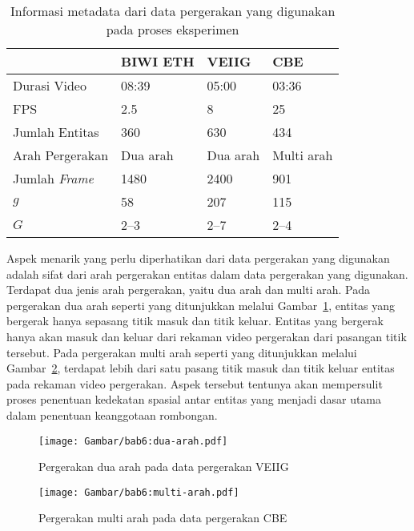 \begin{table}[h]
    \centering
    \caption[Metadata sumber data pergerakan]{Informasi metadata dari data pergerakan yang digunakan pada proses eksperimen}
    \begin{tabular}{p{3cm} p{2.5cm} p{2.5cm} p{3cm}}
        \hline
        & \textbf{BIWI ETH} & \textbf{VEIIG} & \textbf{CBE} \\
        \hline
        Durasi Video & 08:39 & 05:00 & 03:36 \\
        FPS & 2.5 & 8 & 25 \\
        Jumlah Entitas & 360 & 630 & 434 \\
        Arah Pergerakan & Dua arah & Dua arah & Multi arah \\
        Jumlah \textit{Frame} & 1480 & 2400 & 901 \\
        $g$ & 58 & 207 & 115 \\
        $G$ & 2--3 & 2--7 & 2--4 \\
        \hline
    \end{tabular}
    \label{bab6:metadata-pergerakan}
\end{table}

Aspek menarik yang perlu diperhatikan dari data pergerakan yang digunakan adalah sifat dari arah pergerakan entitas dalam data pergerakan yang digunakan. Terdapat dua jenis arah pergerakan, yaitu dua arah dan multi arah. Pada pergerakan dua arah seperti yang ditunjukkan melalui Gambar~\ref{bab6:dua-arah}, entitas yang bergerak hanya sepasang titik masuk dan titik keluar. Entitas yang bergerak hanya akan masuk dan keluar dari rekaman video pergerakan dari pasangan titik tersebut. Pada pergerakan multi arah seperti yang ditunjukkan melalui Gambar~\ref{bab6:multi-arah}, terdapat lebih dari satu pasang titik masuk dan titik keluar entitas pada rekaman video pergerakan. Aspek tersebut tentunya akan mempersulit proses penentuan kedekatan spasial antar entitas yang menjadi dasar utama dalam penentuan keanggotaan rombongan.

\begin{figure}[t]
    \centering
    \captionsetup{width=.65\textwidth}
    \texttt{[image: Gambar/bab6:dua-arah.pdf]}
    \caption[Pergerakan dua arah]{Pergerakan dua arah pada data pergerakan VEIIG}
    \label{bab6:dua-arah}
\end{figure}

\begin{figure}[t!]
    \centering
    \captionsetup{width=.65\textwidth}
    \texttt{[image: Gambar/bab6:multi-arah.pdf]}
    \caption[Pergerakan multi arah]{Pergerakan multi arah pada data pergerakan CBE}
    \label{bab6:multi-arah}
\end{figure}

